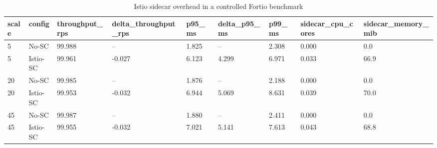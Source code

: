 \begin{table}[t]
\centering
\caption{Istio sidecar overhead in a controlled Fortio benchmark}
\label{tab:istio_mesh_overhead}
\scriptsize
\begin{tabular}{lllllllll}
\toprule
scale & config & throughput\_rps & delta\_throughput\_rps & p95\_ms & delta\_p95\_ms & p99\_ms & sidecar\_cpu\_cores & sidecar\_memory\_mib \\
\midrule
5 & No-SC & 99.988 & -- & 1.825 & -- & 2.308 & 0.000 & 0.0 \\
5 & Istio-SC & 99.961 & -0.027 & 6.123 & 4.299 & 6.971 & 0.033 & 66.9 \\
20 & No-SC & 99.985 & -- & 1.876 & -- & 2.188 & 0.000 & 0.0 \\
20 & Istio-SC & 99.953 & -0.032 & 6.944 & 5.069 & 8.631 & 0.039 & 70.0 \\
45 & No-SC & 99.987 & -- & 1.880 & -- & 2.411 & 0.000 & 0.0 \\
45 & Istio-SC & 99.955 & -0.032 & 7.021 & 5.141 & 7.613 & 0.043 & 68.8 \\
\bottomrule
\end{tabular}
\end{table}
